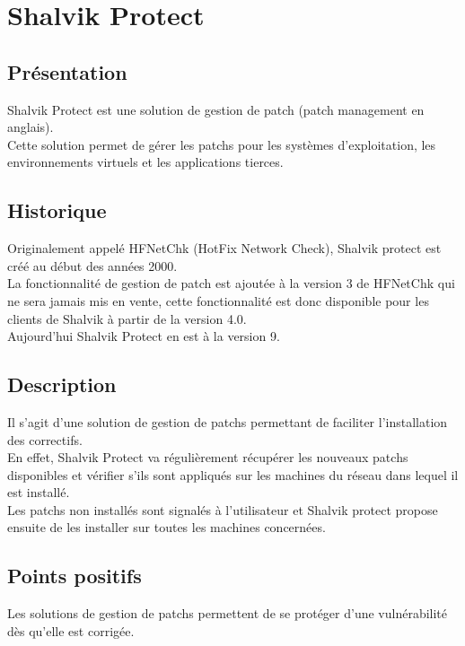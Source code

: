 \section{Shalvik Protect}
\thispagestyle{plain}
\subsection{Présentation}
Shalvik Protect est une solution de gestion de patch (patch management en anglais).\\
Cette solution permet de gérer les patchs pour les systèmes d’exploitation, les environnements virtuels et les applications tierces.\\

\subsection{Historique}
Originalement appelé HFNetChk (HotFix Network Check), Shalvik protect est créé au début des années 2000.\\
La fonctionnalité de gestion de patch est ajoutée à la version 3 de HFNetChk qui ne sera jamais mis en vente, cette fonctionnalité est donc disponible pour les clients de Shalvik à partir de la version 4.0.\\
Aujourd’hui Shalvik Protect en est à la version 9.\\

\subsection{Description}
Il s'agit d'une solution de gestion de patchs permettant de faciliter l’installation des correctifs.\\
En effet, Shalvik Protect va régulièrement récupérer les nouveaux patchs disponibles et vérifier s'ils sont appliqués sur les machines du réseau dans lequel il est installé.\\
Les patchs  non installés sont signalés à l’utilisateur et Shalvik protect propose ensuite de les installer sur toutes les machines concernées.\\


\subsection{Points positifs}
Les solutions de gestion de patchs permettent de se protéger d’une vulnérabilité dès qu’elle est corrigée.\\

